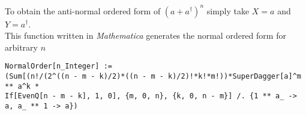 \documentclass[11pt,letterpaper]{article}
\begin{document}
To obtain the anti-normal ordered form of $\left(a+a^{\dagger} \right)^n$ simply take $X=a$ and $Y=a^{\dagger}$.\\ This function written in \emph{Mathematica} generates the normal ordered form for arbitrary $n$
\begin{verbatim}
NormalOrder[n_Integer] := 
(Sum[(n!/(2^((n - m - k)/2)*((n - m - k)/2)!*k!*m!))*SuperDagger[a]^m ** a^k * 
If[EvenQ[n - m - k], 1, 0], {m, 0, n}, {k, 0, n - m}] /. {1 ** a_ -> a, a_ ** 1 -> a})
\end{verbatim}
\end{document}
